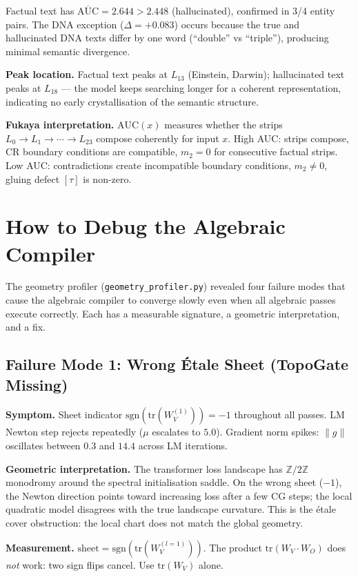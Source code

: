 \documentclass[11pt]{amsart}
\begin{document}
Factual text has $\overline{\mathrm{AUC}} = 2.644 > 2.448$ (hallucinated),
confirmed in 3/4 entity pairs.
The DNA exception ($\Delta = +0.083$) occurs because the true and hallucinated
DNA texts differ by one word (``double'' vs ``triple''), producing minimal
semantic divergence.

\textbf{Peak location.}
Factual text peaks at $L_{13}$ (Einstein, Darwin); hallucinated text peaks
at $L_{18}$ — the model keeps searching longer for a coherent representation,
indicating no early crystallisation of the semantic structure.

\textbf{Fukaya interpretation.}
$\mathrm{AUC}(x)$ measures whether the strips
$L_0 \to L_1 \to \cdots \to L_{23}$ compose coherently for input $x$.
High AUC: strips compose, CR boundary conditions are compatible,
$m_2 = 0$ for consecutive factual strips.
Low AUC: contradictions create incompatible boundary conditions,
$m_2 \neq 0$, gluing defect $[\tau]$ is non-zero.

\section{How to Debug the Algebraic Compiler}
\label{sec:debug}

The geometry profiler (\texttt{geometry\_profiler.py}) revealed four
failure modes that cause the algebraic compiler to converge slowly
even when all algebraic passes execute correctly.
Each has a measurable signature, a geometric interpretation, and a fix.

\subsection{Failure Mode 1: Wrong \'Etale Sheet (TopoGate Missing)}

\textbf{Symptom.}
Sheet indicator $\mathrm{sgn}(\mathrm{tr}(W_V^{(1)})) = -1$ throughout
all passes.
LM Newton step rejects repeatedly ($\mu$ escalates to $5.0$).
Gradient norm spikes: $\|g\|$ oscillates between $0.3$ and $14.4$
across LM iterations.

\textbf{Geometric interpretation.}
The transformer loss landscape has $\mathbb{Z}/2\mathbb{Z}$ monodromy
around the spectral initialisation saddle.
On the wrong sheet ($-1$), the Newton direction points toward increasing
loss after a few CG steps; the local quadratic model disagrees with the
true landscape curvature.
This is the \'etale cover obstruction: the local chart does not match
the global geometry.

\textbf{Measurement.}
$\mathrm{sheet} = \mathrm{sgn}(\mathrm{tr}(W_V^{(l=1)}))$.
The product $\mathrm{tr}(W_V \cdot W_O)$ does \emph{not} work: two sign
flips cancel. Use $\mathrm{tr}(W_V)$ alone.
\end{document}
